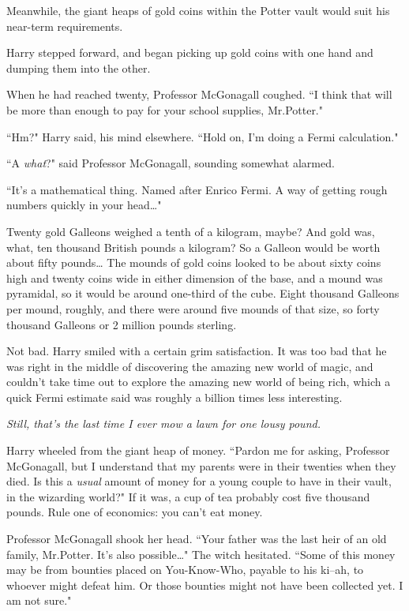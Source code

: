 Meanwhile, the giant heaps of gold coins within the Potter vault would suit his near-term requirements.

Harry stepped forward, and began picking up gold coins with one hand and dumping them into the other.

When he had reached twenty, Professor McGonagall coughed. ``I think that will be more than enough to pay for your school supplies, Mr.\?Potter."

``Hm?" Harry said, his mind elsewhere. ``Hold on, I'm doing a Fermi calculation."

``A \emph{what}?" said Professor McGonagall, sounding somewhat alarmed.

``It's a mathematical thing. Named after Enrico Fermi. A way of getting rough numbers quickly in your head{\ldots}"

Twenty gold Galleons weighed a tenth of a kilogram, maybe? And gold was, what, ten thousand British pounds a kilogram? So a Galleon would be worth about fifty pounds{\ldots} The mounds of gold coins looked to be about sixty coins high and twenty coins wide in either dimension of the base, and a mound was pyramidal, so it would be around one-third of the cube. Eight thousand Galleons per mound, roughly, and there were around five mounds of that size, so forty thousand Galleons or 2 million pounds sterling.

Not bad. Harry smiled with a certain grim satisfaction. It was too bad that he was right in the middle of discovering the amazing new world of magic, and couldn't take time out to explore the amazing new world of being rich, which a quick Fermi estimate said was roughly a billion times less interesting.

\emph{Still, that's the last time I ever mow a lawn for one lousy pound.}

Harry wheeled from the giant heap of money. ``Pardon me for asking, Professor McGonagall, but I understand that my parents were in their twenties when they died. Is this a \emph{usual} amount of money for a young couple to have in their vault, in the wizarding world?" If it was, a cup of tea probably cost five thousand pounds. Rule one of economics: you can't eat money.

Professor McGonagall shook her head. ``Your father was the last heir of an old family, Mr.\?Potter. It's also possible{\ldots}" The witch hesitated. ``Some of this money may be from bounties placed on You-Know-Who, payable to his ki\---ah, to whoever might defeat him. Or those bounties might not have been collected yet. I am not sure."

